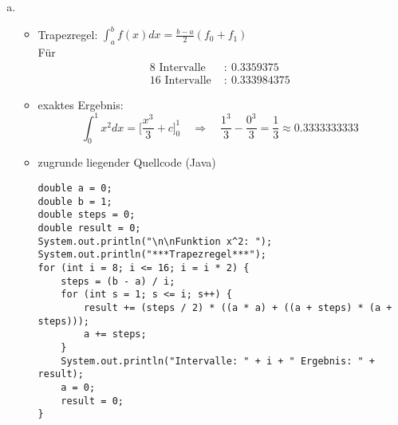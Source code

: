 \documentclass[a4paper,10pt]{article}
\begin{document}
\begin{enumerate}[a)]
\begin{itemize}
\begin{lstlisting}
System.out.println("Funktion log(x): ");
System.out.println("***Trapezregel***");
for (int i = 1; i <= 16; i = i * 2) {
	steps = (b - a) / i;
	for (int s = 1; s <= i; s++) {
		result += (steps / 2) * (Math.log(a) + Math.log(a + steps));
		a += steps;
	}
	System.out.println("Intervalle: " + i + " Ergebnis: " + result);
	a = 1;
	result = 0;
}
			\end{lstlisting}
			\newpage
			\begin{lstlisting}
System.out.println("\n***Simpson-Regel***");
for (int i = 1; i <= 16; i = i * 2) {
	steps = (b - a) / i;
	for (int s = 1; s <= i; s++) {
		result += (steps / 6) * (Math.log(a) + Math.log(a + steps)
			+ 4 * Math.log((steps + a + a) / 2));
		a += steps;
	}
   	System.out.println("Intervalle: " + i + " Ergebnis: " + result);
	a = 1;
	result = 0;
}
			\end{lstlisting}
		\end{itemize}
		\item 
		\begin{itemize}
			\item 
			Trapezregel: $\int_{a}^{b} f(x) dx = \frac{b - a}{2}(f_0 + f_1)$ \\
			Für
			\begin{align*}
			8 \text{ Intervalle } &  : \ 0.3359375\\
			16 \text{ Intervalle } & : \ 0.333984375
			\end{align*}
			\item
			exaktes Ergebnis:
			\[
			\int^1_0 x^2 dx = \Big [\frac{x^3}{3} + c \Big]^1_0 \quad \Rightarrow \quad \frac{1^3}{3} - \frac{0^3}{3} = \frac{1}{3} \approx 0.3333333333
			\]
			\item 
			zugrunde liegender Quellcode (Java)
			\begin{lstlisting}
double a = 0;
double b = 1;
double steps = 0;
double result = 0;
System.out.println("\n\nFunktion x^2: ");
System.out.println("***Trapezregel***");
for (int i = 8; i <= 16; i = i * 2) {
	steps = (b - a) / i;
	for (int s = 1; s <= i; s++) {
		result += (steps / 2) * ((a * a) + ((a + steps) * (a + steps)));
		a += steps;
	}
	System.out.println("Intervalle: " + i + " Ergebnis: " + result);
	a = 0;
	result = 0;
}			
			\end{lstlisting}
		\end{itemize}
	\end{enumerate}
\end{document}
